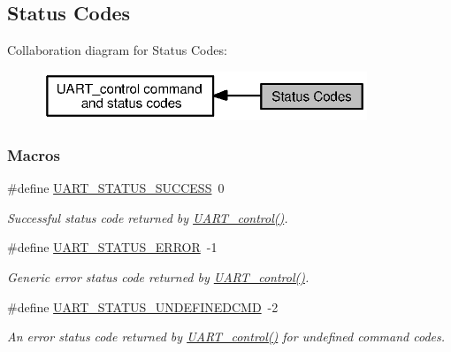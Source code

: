\subsection{Status Codes}
\label{group___u_a_r_t___s_t_a_t_u_s}
Collaboration diagram for Status Codes\+:
\nopagebreak
\begin{figure}[H]
\begin{center}
\leavevmode
\includegraphics[width=275pt]{group___u_a_r_t___s_t_a_t_u_s}
\end{center}
\end{figure}
\subsubsection*{Macros}
\begin{DoxyCompactItemize}
\item 
\#define \hyperlink{group___u_a_r_t___s_t_a_t_u_s_ga101b7761f89b3ec49f0c6726669acfed}{U\+A\+R\+T\+\_\+\+S\+T\+A\+T\+U\+S\+\_\+\+S\+U\+C\+C\+E\+S\+S}~0
\begin{DoxyCompactList}\small\item\em Successful status code returned by \hyperlink{_u_a_r_t_8h_a9de3c26cfe4ce6b7f350a6ea6e16801d}{U\+A\+R\+T\+\_\+control()}. \end{DoxyCompactList}\item 
\#define \hyperlink{group___u_a_r_t___s_t_a_t_u_s_ga2ae076f4aae13ca8e2aea674207df0ad}{U\+A\+R\+T\+\_\+\+S\+T\+A\+T\+U\+S\+\_\+\+E\+R\+R\+O\+R}~-\/1
\begin{DoxyCompactList}\small\item\em Generic error status code returned by \hyperlink{_u_a_r_t_8h_a9de3c26cfe4ce6b7f350a6ea6e16801d}{U\+A\+R\+T\+\_\+control()}. \end{DoxyCompactList}\item 
\#define \hyperlink{group___u_a_r_t___s_t_a_t_u_s_ga61125a2eb8059fd8b96ad95edc68ac2b}{U\+A\+R\+T\+\_\+\+S\+T\+A\+T\+U\+S\+\_\+\+U\+N\+D\+E\+F\+I\+N\+E\+D\+C\+M\+D}~-\/2
\begin{DoxyCompactList}\small\item\em An error status code returned by \hyperlink{_u_a_r_t_8h_a9de3c26cfe4ce6b7f350a6ea6e16801d}{U\+A\+R\+T\+\_\+control()} for undefined command codes. \end{DoxyCompactList}\end{DoxyCompactItemize}


